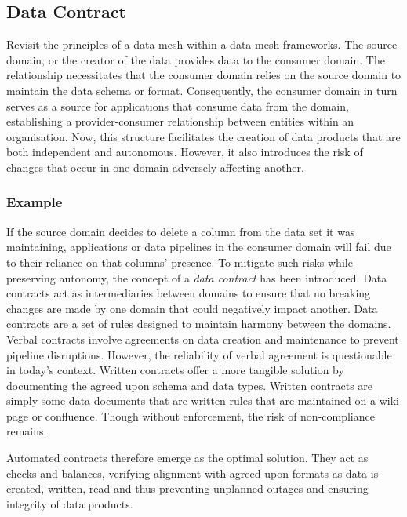 \subsection{Data Contract}
Revisit the principles of a data mesh within a data mesh frameworks.
The source domain, or the creator of the data provides data to the consumer domain.
The relationship necessitates that the consumer domain relies on the source domain to maintain the data schema or format.
Consequently, the consumer domain in turn serves as a source for applications that consume data from the domain, establishing a provider-consumer relationship between entities within an organisation.
Now, this structure facilitates the creation of data products that are both independent and autonomous.
However, it also introduces the risk of changes that occur in one domain adversely affecting another.

\subsubsection{Example}
If the source domain decides to delete a column from the data set it was maintaining, applications or data pipelines in the consumer domain will fail due to their reliance on that columns' presence.
To mitigate such risks while preserving autonomy, the concept of a \textit{data contract} has been introduced.
Data contracts act as intermediaries between domains to ensure that no breaking changes are made by one domain that could negatively impact another.
Data contracts are a set of rules designed to maintain harmony between the domains.
Verbal contracts involve agreements on data creation and maintenance to prevent pipeline disruptions.
However, the reliability of verbal agreement is questionable in today's context.
Written contracts offer a more tangible solution by documenting the agreed upon schema and data types.
Written contracts are simply some data documents that are written rules that are maintained on a wiki page or confluence.
Though without enforcement, the risk of non-compliance remains.

Automated contracts therefore emerge as the optimal solution.
They act as checks and balances, verifying alignment with agreed upon formats as data is created, written, read and thus preventing unplanned outages and ensuring integrity of data products.

